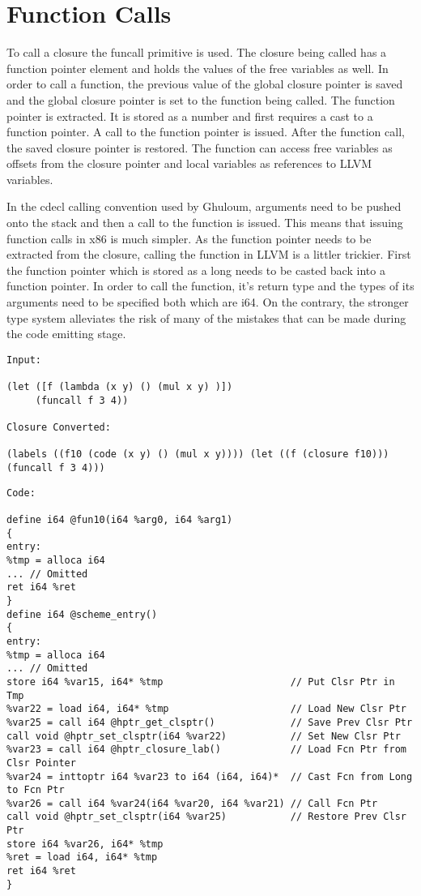 \documentclass{article}
\begin{document}
\section{Function Calls}


To call a closure the funcall primitive is used. The closure being called has a function pointer element and holds the values of the free variables as well. In order to call a function, the previous value of the global closure pointer is saved and the global closure pointer is set to the function being called. The function pointer is extracted. It is stored as a number and first requires a cast to a function pointer. A call to the function pointer is issued. After the function call, the saved closure pointer is restored. The function can access free variables as offsets from the closure pointer and local variables as references to LLVM variables.

In the cdecl calling convention used by Ghuloum, arguments need to be pushed onto the stack and then a call to the function is issued. This means that issuing function calls in x86 is much simpler. As the function pointer needs to be extracted from the closure, calling the function in LLVM is a littler trickier. First the function pointer which is stored as a long needs to be casted back into a function pointer. In order to call the function, it's return type and the types of its arguments need to be specified both which are i64. On the contrary, the stronger type system alleviates the risk of many of the mistakes that can be made during the code emitting stage. 

\begin{verbatim}
Input:

(let ([f (lambda (x y) () (mul x y) )])
     (funcall f 3 4))

Closure Converted:

(labels ((f10 (code (x y) () (mul x y)))) (let ((f (closure f10))) (funcall f 3 4)))

\end{verbatim}

\begin{verbatim}
Code:

define i64 @fun10(i64 %arg0, i64 %arg1)
{
entry: 
%tmp = alloca i64
... // Omitted
ret i64 %ret
}
define i64 @scheme_entry()
{
entry: 
%tmp = alloca i64
... // Omitted
store i64 %var15, i64* %tmp                      // Put Clsr Ptr in Tmp
%var22 = load i64, i64* %tmp                     // Load New Clsr Ptr
%var25 = call i64 @hptr_get_clsptr()             // Save Prev Clsr Ptr
call void @hptr_set_clsptr(i64 %var22)           // Set New Clsr Ptr
%var23 = call i64 @hptr_closure_lab()            // Load Fcn Ptr from Clsr Pointer
%var24 = inttoptr i64 %var23 to i64 (i64, i64)*  // Cast Fcn from Long to Fcn Ptr
%var26 = call i64 %var24(i64 %var20, i64 %var21) // Call Fcn Ptr
call void @hptr_set_clsptr(i64 %var25)           // Restore Prev Clsr Ptr
store i64 %var26, i64* %tmp
%ret = load i64, i64* %tmp
ret i64 %ret
}
\end{verbatim}
\end{document}
